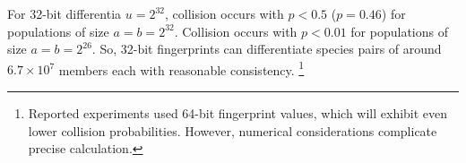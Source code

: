For 32-bit differentia $u = 2^{32}$, collision occurs with $p < 0.5$ ($p = 0.46$) for populations of size $a = b = 2^{32}$.
Collision occurs with $p < 0.01$ for populations of size $a = b = 2^{26}$.
So, 32-bit fingerprints can differentiate species pairs of around $6.7 \times 10^{7}$ members each with reasonable consistency.%
\footnote{
Reported experiments used 64-bit fingerprint values, which will exhibit even lower collision probabilities.
However, numerical considerations complicate precise calculation.
}
